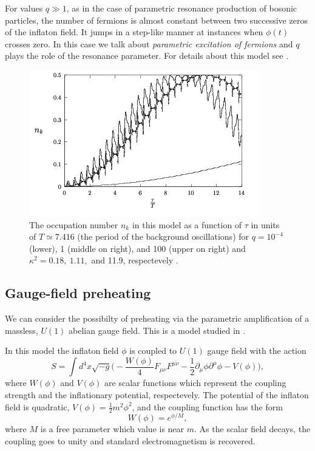 \documentclass[11pt,a4paper,twoside]{book}
\begin{document}
For values $ q \gg 1 $, as in the case of parametric resonance production of bosonic particles, the number of fermions is almost constant between two successive zeros of the inflaton field. It jumps in a step-like manner at instances when $\phi(t)$ crosses zero. In this case we talk about \textit{parametric excitation of fermions} and $ q $ plays the role of the resonance parameter. For details about this model see \cite{Chap4:FermionPreheating}.
\begin{figure}
	\centering
	\includegraphics[width=0.7\linewidth, height=0.3\textheight]{Images/Chap4/FermionicPreheating}
	\caption{The occupation number $ n_{k} $ in this model as a function of $ \tau $ in units of $ T\simeq 7.416 $ (the period of the background oscillations) for $ q=10^{-4} $ (lower), 1 (middle on right), and 100 (upper on right) and $ \kappa^{2} = 0.18,\ 1.11, $ and 11.9, respectevely \cite{Chap4:FermionPreheating}.}
	\label{fig:fermionicpreheating}
\end{figure}

\subsection{Gauge-field preheating}
We can consider the possibilty of preheating via the parametric amplification of a massless, $ U(1) $ abelian gauge field. This is a model studied in \cite{Chap4:GaugeFieldPreheating}. 

In this model the inflaton field $\phi$ is coupled to $ U(1) $ gauge field with the action
\begin{equation}
\label{Chap4:OtherModels_GaugeFieldPreheatingAction}
S = \int d^{4}x \sqrt{-g}\Bigg(-\frac{W(\phi)}{4}F_{\mu\nu}F^{\mu\nu} - \frac{1}{2}\partial_{\mu}\phi\partial^{\mu}\phi - V(\phi)\Bigg),
\end{equation}
where $ W(\phi) $ and $ V(\phi) $ are scalar functions which represent the coupling strength and the inflationary potential, respectevely. The potential of the inflaton field is quadratic, $ V(\phi)=\frac{1}{2}m^{2}\phi^{2} $, and the coupling function has the form
\begin{equation}
\label{Chap4:OtherModels_GaugeFieldPotentialCoupling}
W(\phi)=e^{\phi/M},
\end{equation}
where $ M $ is a free parameter which value is near $ m $. As the scalar field decays, the coupling goes to unity and standard electromagnetism is recovered.
\end{document}
